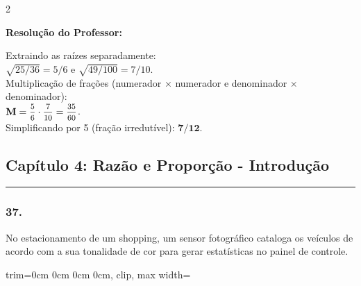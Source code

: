 \begin{multicols*}{2}
\ifgabarito
    \begin{tcolorbox}[colback=CorTitUm!5, colframe=CorTitUm, boxrule=1pt, arc=4pt, left=6pt, right=6pt, top=6pt, bottom=6pt]
    \small\textbf{\textcolor{CorTitUm}{Resolução do Professor:}}\par\vspace{0.1cm}
    \color{CinzaEscuro}
    Extraindo as raízes separadamente:\\
    $ \sqrt{25/36} = 5/6 $ e $ \sqrt{49/100} = 7/10 $.\\
    Multiplicação de frações (numerador $\times$ numerador e denominador $\times$ denominador):\\
    $ \textbf{M} = \mfrac{5}{6} \cdot \mfrac{7}{10} = \mfrac{35}{60} $.\\
    Simplificando por 5 (fração irredutível): $ \textbf{7/12} $.
    \end{tcolorbox}
\fi

\par\vspace{\espacoQuestao}

\subsection*{Capítulo 4: Razão e Proporção - Introdução}
\vspace{-0.2cm}\noindent\rule{\linewidth}{1.5pt} 
\par\vspace{\espacoPosTitulo}
\subsubsection*{37.} No estacionamento de um shopping, um sensor fotográfico cataloga os veículos de acordo com a sua tonalidade de cor para gerar estatísticas no painel de controle.
\begin{center}
\begin{adjustbox}{trim=0cm 0cm 0cm 0cm, clip, max width=\larguraTikz}
\end{adjustbox}
\end{center}
\end{multicols*}
